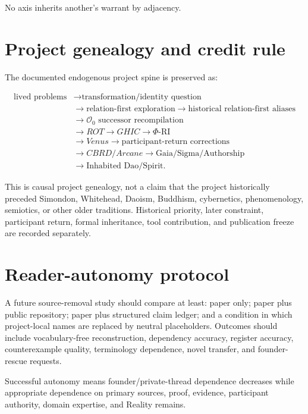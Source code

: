 \documentclass[11pt]{article}
\begin{document}
No axis inherits another's warrant by adjacency.

\section{Project genealogy and credit rule}

The documented endogenous project spine is preserved as:

\begin{equation}
\begin{aligned}
\text{lived problems}
&\rightarrow\text{transformation/identity question}\\
&\rightarrow\text{relation-first exploration}\rightarrow\text{historical relation-first aliases}\\
&\rightarrow\mathcal O_0\text{ successor recompilation}\\
&\rightarrow ROT\rightarrow GHIC\rightarrow\Phi\text{-RI}\\
&\rightarrow Venus\rightarrow\text{participant-return corrections}\\
&\rightarrow CBRD/Arcane\rightarrow\text{Gaia/Sigma/Authorship}\\
&\rightarrow\text{Inhabited Dao/Spirit}.
\end{aligned}
\end{equation}

This is causal project genealogy, not a claim that the project historically preceded Simondon, Whitehead, Daoism, Buddhism, cybernetics, phenomenology, semiotics, or other older traditions. Historical priority, later constraint, participant return, formal inheritance, tool contribution, and publication freeze are recorded separately.

\section{Reader-autonomy protocol}

A future source-removal study should compare at least: paper only; paper plus public repository; paper plus structured claim ledger; and a condition in which project-local names are replaced by neutral placeholders. Outcomes should include vocabulary-free reconstruction, dependency accuracy, register accuracy, counterexample quality, terminology dependence, novel transfer, and founder-rescue requests.

Successful autonomy means founder/private-thread dependence decreases while appropriate dependence on primary sources, proof, evidence, participant authority, domain expertise, and Reality remains.
\end{document}
